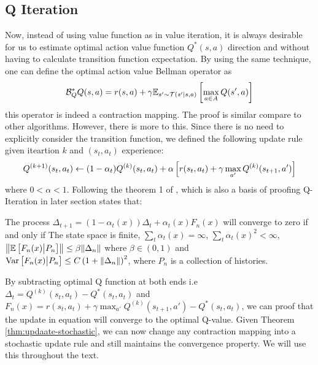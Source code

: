 \subsection{Q Iteration}
\label{sec:chap2-Q-iter}
Now, instead of using value function as in value iteration, it is always desirable for us to estimate optimal action value function $Q^*(s, a)$ direction and without having to calculate transition function expectation. By using the same technique, one can define the optimal action value Bellman operator as 
\begin{equation}
    \mathcal{B}^*_Q Q(s, a) = r(s, a) + \gamma \mathbb{E}_{s' \sim \mathcal{T}(s' | s, a)}\left[ \max_{a\in A} Q(s', a) \right] 
\end{equation}
this operator is indeed a contraction mapping. The proof is similar compare to other algorithms. However, there is more to this. Since there is no need to explicitly consider the transition function, we defined the following update rule given iteartion $k$ and $(s_t, a_t)$ experience:
\begin{equation}
\label{eqn:chap2-Q-stochastic-update}
    Q^{(k+1)}(s_t, a_t) \leftarrow (1-\alpha_t) Q^{(k)}(s_t, a_t) + \alpha\left[ r(s_t, a_t) + \gamma \max_{a'} Q^{(k)}(s_{t+1}, a') \right]
\end{equation}
where $0 < \alpha < 1$. Following the theorem 1 of \cite{jaakkola1994convergence}, which is also a basis of proofing Q-Iteration in later section states that:
\begin{theorem}
\label{thm:updaate-stochastic}{\cite{jaakkola1994convergence}}
    The process $\Delta_{t+1} = (1-\alpha_t(x)) \Delta_t + \alpha_t(x) F_n(x) $ will converge to zero if and only if The state space is finite, $\sum_t \alpha_t(x) = \infty$, $\sum_t \alpha_t(x)^2 < \infty$, $\left\|\mathbb{E}\left[ F_n(x) \big| P_n \right] \right\| \le \beta \|\Delta_n\|$ where $\beta \in (0, 1)$ and  $\operatorname{Var}\left[ F_n(x) \big| P_n \right] \le C\left( 1 + \|\Delta_n\| \right)^2$, where $P_n$ is a collection of histories. 
\end{theorem}
By subtracting optimal Q function at both ends i.e $\Delta_t = Q^{(k)}(s_t, a_t) - Q^*(s_t, a_t)$ and $F_n(x) = r(s_t, a_t) + \gamma \max_{a'} Q^{(k)}(s_{t+1}, a') - Q^*(s_t, a_t)$, we can proof that the update in equation \label{eqn:chap2-Q-stochastic-update} will converge to the optimal Q-value. Given Theorem \ref{thm:updaate-stochastic}, we can now change any contraction mapping into a stochastic update rule and still maintains the convergence property. We will use this throughout the text.